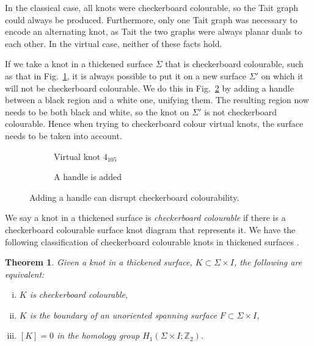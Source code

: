 \documentclass[12pt]{report}
\newcommand{\Z}{\mathbb{Z}}
\newtheorem*{theorem}{Theorem}
\begin{document}
In the classical case, all knots were checkerboard colourable, so the Tait graph could always be produced. Furthermore, only one Tait graph was necessary to encode an alternating knot, as Tait the two graphs were always planar duals to each other. In the virtual case, neither of these facts hold.

If we take a knot in a thickened surface $\Sigma$ that is checkerboard colourable, such as that in Fig.~\ref{fig:4-105-vknot}, it is always possible to put it on a new surface $\Sigma'$ on which it will not be checkerboard colourable. We do this in Fig.~\ref{fig:4-105-vknot-with-handle} by adding a handle between a black region and a white one, unifying them. The resulting region now needs to be both black and white, so the knot on $\Sigma'$ is not checkerboard colourable. Hence when trying to checkerboard colour virtual knots, the surface needs to be taken into account.

\begin{figure}[hbt]
	\centering
	\hspace*{\fill}
	\begin{subfigure}[b]{0.4 \textwidth}
		\centering
		\def\svgscale{0.35}
		
		\caption{Virtual knot $4_{105}$}
		\label{fig:4-105-vknot}
	\end{subfigure}
	\hspace*{\fill}	\hspace*{\fill}	\hspace*{\fill}
	\begin{subfigure}[b]{0.4 \textwidth}
		\centering
		\def\svgscale{0.35}
		
		\caption{A handle is added}
		\label{fig:4-105-vknot-with-handle}
	\end{subfigure}
	\hspace*{\fill} 
	\caption{Adding a handle can disrupt checkerboard colourability.}
	\label{fig:adding-handle-to-4-105}
\end{figure}

We say a knot in a thickened surface is \textit{checkerboard colourable} if there is a checkerboard colourable surface knot diagram that represents it. We have the following classification of checkerboard colourable knots in thickened surfaces \cite{minimal-diagrams-surface-links}.

\begin{theorem}
Given a knot in a thickened surface, $K \subset \Sigma \times I$, the following are equivalent:
	\begin{enumerate}[(i)]
	\item $K$ is checkerboard colourable,
	\item $K$ is the boundary of an unoriented spanning surface $F \subset \Sigma \times I$,
	\item $[K] = 0$ in the homology group $H_{1}(\Sigma \times I; \Z_{2})$.
	\end{enumerate} 
\end{theorem}
\end{document}
